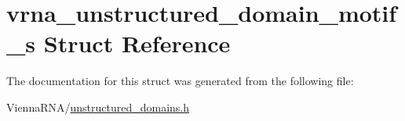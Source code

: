 \hypertarget{structvrna__unstructured__domain__motif__s}{}\section{vrna\+\_\+unstructured\+\_\+domain\+\_\+motif\+\_\+s Struct Reference}
\label{structvrna__unstructured__domain__motif__s}


The documentation for this struct was generated from the following file\+:\begin{DoxyCompactItemize}
\item 
Vienna\+R\+N\+A/\hyperlink{unstructured__domains_8h}{unstructured\+\_\+domains.\+h}\end{DoxyCompactItemize}
